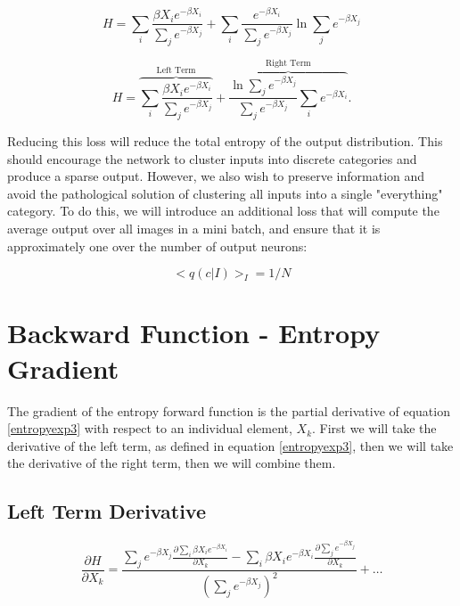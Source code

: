 \begin{displaymath}
    H =
    \sum_{i}\frac{\beta X_{i} e^{-\beta X_{i}}}{\sum_{j}e^{-\beta X_{j}}} + 
    \sum_{i}\frac{e^{-\beta X_{i}}}{\sum_{j}e^{-\beta X_{j}}}\ln{\sum_{j}e^{-\beta X_{j}}}
\label{entropyexp2}
\end{displaymath}

\begin{equation}
    H =
    \overbrace{\sum_{i}\frac{\beta X_{i}e^{-\beta X_{i}}}{\sum_{j}e^{-\beta X_{j}}}}^\text{Left Term} + 
    \overbrace{\frac{\ln{\sum_{j}e^{-\beta X_{j}}}}{\sum_{j}e^{-\beta X_{j}}}\sum_{i}e^{-\beta X_{i}}}^\text{Right Term}.
\label{entropyexp3}
\end{equation}

\noindent Reducing this loss will reduce the total entropy of the output distribution. This should encourage the network to cluster inputs into discrete categories and produce a sparse output. However, we also wish to preserve information and avoid the pathological solution of clustering all inputs into a single "everything" category. To do this, we will introduce an additional loss that will compute the average output over all images in a mini batch, and ensure that it is approximately one over the number of output neurons: 

\begin{equation}
<q(c|I)>_{I} = 1/N
\end{equation}

\section{Backward Function - Entropy Gradient} \label{backward}
\noindent The gradient of the entropy forward function is the partial derivative of equation \ref{entropyexp3} with respect to an individual element, $X_{k}$. First we will take the derivative of the left term, as defined in equation \ref{entropyexp3}, then we will take the derivative of the right term, then we will combine them.

\subsection{Left Term Derivative}


\begin{displaymath}
    \frac{\partial H}{\partial X_{k}} =
    \frac{\sum_{j}e^{-\beta X_{j}}\frac{\partial\sum_{i}\beta X_{i} e^{-\beta X_{i}}}{\partial X_{k}}
    - \sum_{i}\beta X_{i} e^{-\beta X_{i}}\frac{\partial\sum_{j}e^{-\beta X_{j}}}{\partial X_{k}}}{\left(\sum_{j}e^{-\beta X_{j}}\right)^{2}}
    + \ldots
\end{displaymath}

